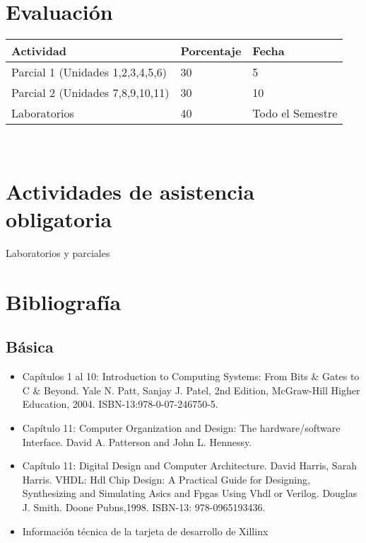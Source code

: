 \documentclass[11pt]{article}
\begin{document}
\section*{Evaluación}
\noindent \begin{tabular}{R{0.5\textwidth} C{0.2\textwidth} C{0.2\textwidth}}
	\toprule
	\textbf{Actividad} & \textbf{Porcentaje} & \textbf{Fecha} \\
	\midrule
	Parcial 1 (Unidades 1,2,3,4,5,6) & 30 & 5 \\ Parcial 2 (Unidades 7,8,9,10,11) & 30 & 10 \\ Laboratorios & 40 & Todo el Semestre \\
	\midrule
\end{tabular}
\\
\section*{Actividades de asistencia obligatoria}

Laboratorios y parciales

\section*{Bibliografía}

\subsection*{Básica}

\begin{itemize}
\item Capítulos 1 al 10: Introduction to Computing Systems: From Bits \& Gates to C \& Beyond. Yale N. Patt, Sanjay J. Patel, 2nd Edition, McGraw-Hill Higher Education, 2004. ISBN-13:978-0-07-246750-5. \item Capítulo 11: Computer Organization and Design: The hardware/software Interface. David A. Patterson and John L. Hennessy. \item Capítulo 11: Digital Design and Computer Architecture. David Harris, Sarah Harris. VHDL: Hdl Chip Design: A Practical Guide for Designing, Synthesizing and Simulating Asics and Fpgas Using Vhdl or Verilog. Douglas J. Smith. Doone Pubns,1998. ISBN-13: 978-0965193436. \item Información técnica de la tarjeta de desarrollo de Xillinx
\end{itemize}
\end{document}
